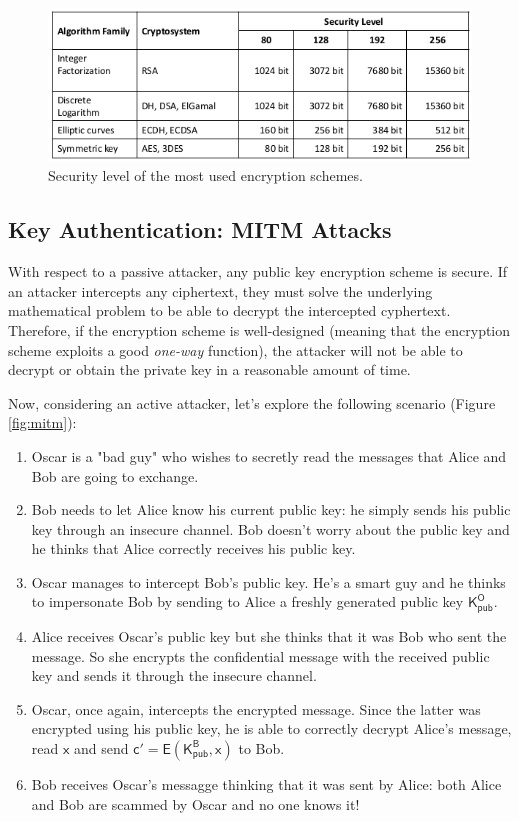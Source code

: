 \documentclass{article}
\begin{document}
\begin{figure}
    \centering
    \includegraphics[width=0.75\linewidth]{figures/security_level.png}
    \caption{\label{fig:security_level}Security level of the most used encryption schemes.}
\end{figure}


\subsection{Key Authentication: MITM Attacks}

With respect to a passive attacker, any public key encryption scheme is secure. If an attacker intercepts any ciphertext, they must solve the underlying mathematical problem to be able to decrypt the intercepted cyphertext. Therefore, if the encryption scheme is well-designed (meaning that the encryption scheme exploits a good \textit{one-way} function), the attacker will not be able to decrypt or obtain the private key in a reasonable amount of time. \newline

\par \noindent Now, considering an active attacker, let's explore the following scenario (Figure \ref{fig:mitm}):

\begin{enumerate}
    \item Oscar is a "bad guy" who wishes to secretly read the messages that Alice and Bob are going to exchange.
    \item Bob needs to let Alice know his current public key: he simply sends his public key through an insecure channel. Bob doesn't worry about the public key and he thinks that Alice correctly receives  his public key.
    \item Oscar manages to intercept Bob's public key. He's a smart guy and he thinks to impersonate Bob by sending to Alice a freshly generated public key $\mathsf{K_{pub}^{O}}$.
    \item Alice receives Oscar's public key but she thinks that it was Bob who sent the message. So she encrypts the confidential message with the received public key and sends it through the insecure channel.
    \item Oscar, once again, intercepts the encrypted message. Since the latter was encrypted using his public key, he is able to correctly decrypt Alice's message, read $\mathsf{x}$ and send $\mathsf{c' = E(K_{pub}^{B}, x)}$ to Bob.
    \item Bob receives Oscar's messagge thinking that it was sent by Alice: both Alice and Bob are scammed by Oscar and no one knows it!
\end{enumerate}
\end{document}
